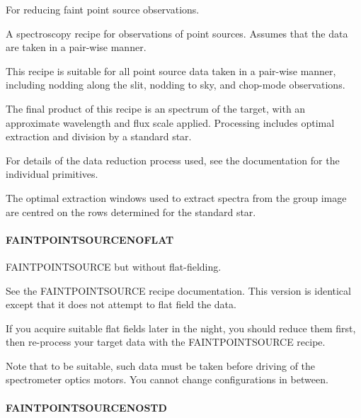 \documentclass[twoside,11pt]{article}
\renewcommand{\_}{\texttt{\symbol{95}}}
\begin{document}
For reducing faint point source observations.


\mbox{}


A spectroscopy recipe for observations of point sources.
Assumes that the data are taken in a pair-wise manner.



This recipe is suitable for all point source data taken in a pair-wise
manner, including nodding along the slit, nodding to sky, and
chop-mode observations.



The final product of this recipe is an spectrum of the target, with an
approximate wavelength and flux scale applied. Processing includes
optimal extraction and division by a standard star.



For details of the data reduction process used, see the documentation
for the individual primitives.



The optimal extraction windows used to extract spectra from the group
image are centred on the rows determined for the standard star.

\paragraph{FAINT\_POINT\_SOURCE\_NOFLAT\label{FAINT_POINT_SOURCE_NOFLAT}}


FAINT\_POINT\_SOURCE but without flat-fielding.


\mbox{}


See the FAINT\_POINT\_SOURCE recipe documentation. This version is
identical except that it does not attempt to flat field the data.



If you acquire suitable flat fields later in the night, you should
reduce them first, then re-process your target data with the
FAINT\_POINT\_SOURCE recipe.



Note that to be suitable, such data must be taken before driving
of the spectrometer optics motors. You cannot change configurations
in between.

\paragraph{FAINT\_POINT\_SOURCE\_NOSTD\label{FAINT_POINT_SOURCE_NOSTD}}
\end{document}
